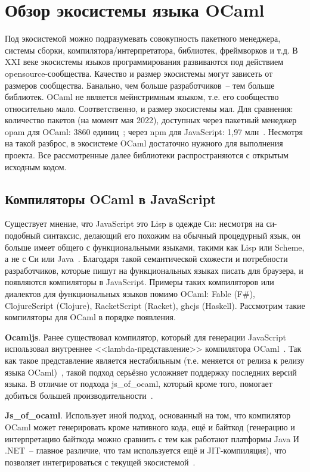 \section{Обзор экосистемы языка OCaml}

Под экосистемой можно подразумевать совокупность пакетного менеджера, системы сборки, компилятора/интерпретатора, библиотек, фреймворков и т.д.
В XXI веке экосистемы языков программирования развиваются под действием opensource-сообщества.
Качество и размер экосистемы могут зависеть от размеров сообщества. Банально, чем больше разработчиков~-- тем больше библиотек.
OCaml не является мейнстримным языком, т.е. его сообщество относительно мало. Соответственно, и размер экосистемы мал.
Для сравнения: количество пакетов (на момент мая 2022),
доступных через пакетный менеджер opam для OCaml: 3860 единиц~\cite{opam};
через npm для JavaScript: 1,97 млн~\cite{npmjs}.
Несмотря на такой разброс, в экосистеме OCaml достаточно нужного для выполнения проекта.
Все рассмотренные далее библиотеки распространяются с открытым исходным кодом.

\subsection{Компиляторы OCaml в JavaScript}\label{jsoo}

Существует мнение, что JavaScript это Lisp в одежде Си:
несмотря на си-подобный синтаксис, делающий его похожим на обычный процедурный язык,
он больше имеет общего с функциональными языками, такими как Lisp или Scheme,
а не с Си или Java~\cite{crockford}. Благодаря такой семантической схожести и
потребности разработчиков, которые пишут на функциональных языках писать для браузера,
и появляются компиляторы в JavaScript. Примеры таких компиляторов или диалектов для функциональных языков помимо OCaml:
Fable (F\#), ClojureScript (Clojure), RacketScript (Racket), ghcjs (Haskell).
Рассмотрим такие компиляторы для OCaml в порядке появления.

\textbf{Ocamljs}. Ранее существовал компилятор, который для генерации JavaScript
использовал внутреннее <<lambda-представление>> компилятора OCaml~\cite{ocamljs-lambda}.
Так как такое представление является нестабильным (т.е. меняется от релиза к релизу языка OCaml)~\cite{rwo-backend},
такой подход серьёзно усложняет поддержку последних версий языка. В отличие от подхода js\_of\_ocaml,
который кроме того,
помогает добиться большей производительности~\cite[с.~13]{vouillon-jsoo}.

\textbf{Js\_of\_ocaml}. Использует иной подход, основанный на том, что компилятор OCaml
может генерировать кроме нативного кода, ещё и байткод
(генерацию и интерпретацию байткода можно сравнить с тем как работают платформы Java И .NET~--
главное различие, что там используется ещё и JIT-компиляция), что позволяет
интегрироваться с текущей экосистемой~\cite[с.~1]{vouillon-jsoo}.

